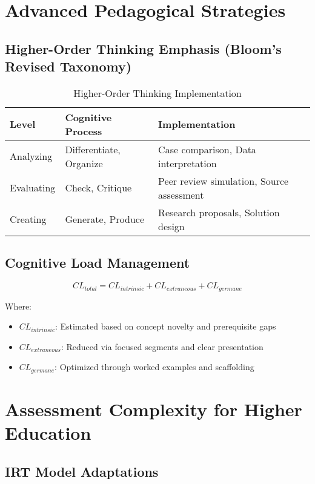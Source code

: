 \documentclass[11pt,a4paper]{report}
\begin{document}
\section{Advanced Pedagogical Strategies}

\subsection{Higher-Order Thinking Emphasis (Bloom's Revised Taxonomy)}

\begin{table}[H]
\centering
\caption{Higher-Order Thinking Implementation}
\begin{tabular}{lll}
\toprule
\textbf{Level} & \textbf{Cognitive Process} & \textbf{Implementation} \\
\midrule
Analyzing & Differentiate, Organize & Case comparison, Data interpretation \\
Evaluating & Check, Critique & Peer review simulation, Source assessment \\
Creating & Generate, Produce & Research proposals, Solution design \\
\bottomrule
\end{tabular}
\end{table}

\subsection{Cognitive Load Management}

\begin{equation}
CL_{total} = CL_{intrinsic} + CL_{extraneous} + CL_{germane}
\end{equation}

Where:
\begin{itemize}
    \item $CL_{intrinsic}$: Estimated based on concept novelty and prerequisite gaps
    \item $CL_{extraneous}$: Reduced via focused segments and clear presentation
    \item $CL_{germane}$: Optimized through worked examples and scaffolding
\end{itemize}

\section{Assessment Complexity for Higher Education}

\subsection{IRT Model Adaptations}
\end{document}
